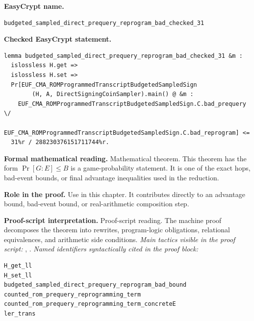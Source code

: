 \begin{formaltheorem}
\noindent\textbf{EasyCrypt name.}
\begin{lstlisting}[language=EasyCrypt,basicstyle=\ttfamily\scriptsize]
budgeted_sampled_direct_prequery_reprogram_bad_checked_31
\end{lstlisting}
\noindent\textbf{Checked EasyCrypt statement.}
\begin{lstlisting}[language=EasyCrypt,basicstyle=\ttfamily\scriptsize]
lemma budgeted_sampled_direct_prequery_reprogram_bad_checked_31 &m :
  islossless H.get =>
  islossless H.set =>
  Pr[EUF_CMA_ROMProgrammedTranscriptBudgetedSampledSign
        (H, A, DirectSigningCoinSampler).main() @ &m :
    EUF_CMA_ROMProgrammedTranscriptBudgetedSampledSign.C.bad_prequery \/
    EUF_CMA_ROMProgrammedTranscriptBudgetedSampledSign.C.bad_reprogram] <=
  31%r / 288230376151711744%r.
\end{lstlisting}
\noindent\textbf{Formal mathematical reading.}
Mathematical theorem. This theorem has the form \(\Pr[G:E] \le B\) is a game-probability statement.  It is one of the exact hops, bad-event bounds, or final advantage inequalities used in the reduction.

\noindent\textbf{Role in the proof.}
Use in this chapter. It contributes directly to an advantage bound, bad-event bound, or real-arithmetic composition step.

\noindent\textbf{Proof-script interpretation.}
Proof-script reading. The machine proof decomposes the theorem into rewrites, program-logic obligations, relational equivalences, and arithmetic side conditions.
\emph{Main tactics visible in the proof script:} , .
\emph{Named identifiers syntactically cited in the proof block:}
\begin{lstlisting}[language=EasyCrypt,basicstyle=\ttfamily\scriptsize]
H_get_ll
H_set_ll
budgeted_sampled_direct_prequery_reprogram_bad_bound
counted_rom_prequery_reprogramming_term
counted_rom_prequery_reprogramming_term_concreteE
ler_trans
\end{lstlisting}

\end{formaltheorem}

